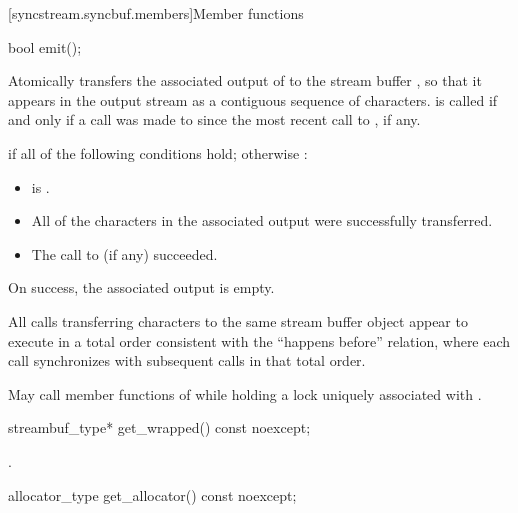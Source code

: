 [syncstream.syncbuf.members]{Member functions}

%
\begin{itemdecl}
bool emit();
\end{itemdecl}

\begin{itemdescr}
\pnum
\effects
Atomically transfers the associated output of 
to the stream buffer ,
so that it appears in the output stream
as a contiguous sequence of characters.
 is called
if and only if a call was made to 
since the most recent call to , if any.

\pnum
\returns
{} if all of the following conditions hold;
otherwise :
\begin{itemize}
\item {} is .
\item All of the characters in the associated output were successfully transferred.
\item The call to  (if any) succeeded.
\end{itemize}

\pnum
\ensures
On success, the associated output is empty.

\pnum
\sync
All  calls transferring characters
to the same stream buffer object
appear to execute in a total order
consistent with the ``happens before'' relation,
where each  call
synchronizes with
subsequent  calls in that total order.

\pnum
\remarks
May call member functions of 
while holding a lock uniquely associated with .
\end{itemdescr}

%
\begin{itemdecl}
streambuf_type* get_wrapped() const noexcept;
\end{itemdecl}

\begin{itemdescr}
\pnum
\returns
{}.
\end{itemdescr}

%
\begin{itemdecl}
allocator_type get_allocator() const noexcept;
\end{itemdecl}


